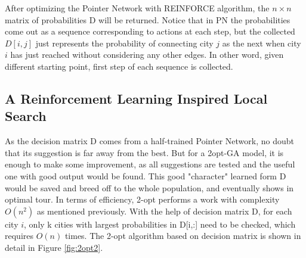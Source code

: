 \documentclass[twocolumn]{article}
\begin{document}
After optimizing the Pointer Network with REINFORCE algorithm, the $n\times n$ matrix of probabilities D will be returned. Notice that in PN the probabilities come out as a sequence corresponding to actions at each step, but the collected $D[i,j]$ just represents the probability of connecting city $j$ as the next when city $i$ has just reached without considering any other edges. In other word, given different starting point, first step of each sequence is collected.


\subsection{A Reinforcement Learning Inspired Local Search}

As the decision matrix D comes from a half-trained Pointer Network, no doubt that its suggestion is far away from the best. But for a 2opt-GA model, it is enough to make some improvement, as all suggestions are tested and the useful one with good output would be found. This good "character" learned form D would be saved and breed off to the whole population, and eventually shows in optimal tour.  In terms of efficiency, 2-opt performs a work with complexity $O(n^2)$ as mentioned previously. With the help of decision matrix D, for each city $i$, only k cities with largest probabilities in D[i,:] need to be checked, which requires $O(n)$ times. The 2-opt algorithm based on decision matrix is shown in detail in Figure \ref{fig:2opt2}.
\end{document}
